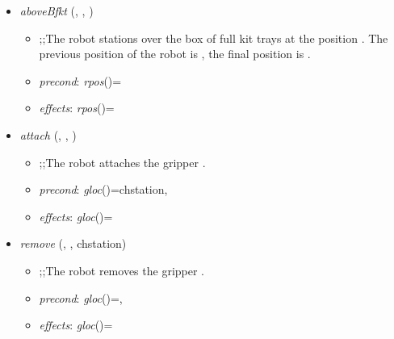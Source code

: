 \begin{itemize}
\item \textit{aboveBfkt} (\boxfkt, {}, {})
\begin{itemize}
\item ;;The robot \robot stations over the box of full kit trays at the position {}. The previous position of the robot is {}, the final position is {}.
\item \textit{precond}: \textit{rpos}(\robot)={}
\item \textit{effects}: \textit{rpos}(\robot)={}
\end{itemize}

\item \textit{attach} (\robot, \grip, \chstation)
\begin{itemize}
\item ;;The robot \robot attaches the gripper \grip.
\item \textit{precond}: \textit{gloc}(\grip)=chstation,
\item \textit{effects}: \textit{gloc}(\grip)=\robot
\end{itemize}

\item \textit{remove} (\robot, \grip, chstation)
\begin{itemize}
\item ;;The robot \robot removes the gripper \grip.
\item \textit{precond}: \textit{gloc}(\grip)=\robot,
\item \textit{effects}: \textit{gloc}(\grip)=\chstation
\end{itemize}
\end{itemize} 